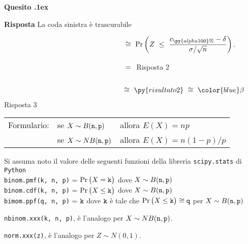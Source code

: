 \documentclass[11pt,twoside,a4paper]{article}
\newcounter{quesito}
\newenvironment{question}{\addtocounter{quesito}{1}\par\textbf{Quesito \thequesito.\kern1ex}}{\vspace{0.5\parskip}}
\newenvironment{answer}{\par\textbf{Risposta\quad}}{\vspace{\parskip}}
\begin{document}
\begin{question}
\begin{answer}
La coda sinistra è trascurabile

$\qquad\phantom{\Pr\Big(|\bar X-\mu_0|\ \le\  c_{\py{alpha100}\%}\Big)}
\ \cong\ 
\Pr\left(Z\ \le\  \dfrac{c_{\py{alpha100}\%}-\delta}{\sigma/\sqrt{n}}\right)$.

$\qquad\phantom{\Pr\Big(|\bar X-\mu_0|\ \le\  c_{\py{alpha100}\%}\Big)}
\ =\ $
{\tt{}}\hfill{\color{blue} Risposta 2}


$\qquad\phantom{\Pr\left(|Z|\le \left|\dfrac{c_{\py{alpha100}\%}-\delta}{\sigma/\sqrt{n}}\right|\right)}
\ \cong\  
\py{risultato2}
\ \cong\ 
{\color{blue}\beta}$\hfill{\color{blue} Risposta 3}

\end{answer}
\end{question}


\vfill\hrulefill\par
\begin{tabular}{@{}lll}
Formulario:& se $X\sim B({\tt n},{\tt p})$ & allora $E(X)=np$\\
           & se $X\sim NB({\tt n},{\tt p})$& allora $E(X)=n(1-p)/p$
\end{tabular}

Si assuma noto il valore delle seguenti funzioni della libreria {\tt scipy.stats\/} di  {\tt Python\/}\\
{\tt binom.pmf(k, n, p)} = $\Pr\big(X={\tt k}\big)$ dove $X\sim B({\tt n},{\tt p})$\\
{\tt binom.cdf(k, n, p)} = $\Pr\big(X\le{\tt k}\big)$ dove  $X\sim B({\tt n},{\tt p})$ \\
{\tt bimom.ppf(q, n, p)} = ${\tt k}$ dove ${\tt k}$ è tale che $\Pr\big(X\le{\tt k}\big)\cong{\tt q}$ per $X\sim B({\tt n},{\tt p})$ 

{\tt nbinom.xxx(k, n, p)}, è l'analogo per $X\sim NB({\tt n},{\tt p})$.

{\tt norm.xxx(z)}, è l'analogo per $Z\sim N(0,1)$.
\end{document}
